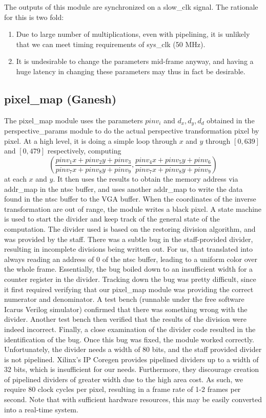 \documentclass{article}
\begin{document}
The outputs of this module are synchronized on a slow\_clk signal.
The rationale for this is two fold:
\begin{enumerate}
    \item Due to large number of multiplications, even with pipelining, it is unlikely that we can meet timing requirements of sys\_clk (50 MHz).
    \item It is undesirable to change the parameters mid-frame anyway, and having a huge latency in changing these parameters may thus in fact be desirable.
\end{enumerate}

\subsection{pixel\_map (Ganesh)}
The pixel\_map module uses the parameters $pinv_i$ and $d_x, d_y, d_d$ obtained in the perspective\_params module to do the actual perspective transformation pixel by pixel.
At a high level, it is doing a simple loop through $x$ and $y$ through $[0, 639]$ and $[0, 479]$ respectively, computing
\begin{equation*}
    \left( \frac{pinv_1 x + pinv_2 y + pinv_3}{pinv_7 x + pinv_8 y + pinv_9}, \frac{pinv_4 x + pinv_5 y + pinv_6}{pinv_7 x + pinv_8 y + pinv_9} \right)
\end{equation*}
at each $x$ and $y$.
It then uses the results to obtain the memory address via addr\_map in the ntsc buffer,
and uses another addr\_map to write the data found in the ntsc buffer to the VGA buffer.
When the coordinates of the inverse transformation are out of range,
the module writes a black pixel.
A state machine is used to start the divider and keep track of the general state of the computation.
The divider used is based on the restoring division algorithm,
and was provided by the staff.
There was a subtle bug in the staff-provided divider, resulting in incomplete divisions being written out.
For us, that translated into always reading an address of $0$ of the ntsc buffer,
leading to a uniform color over the whole frame.
Essentially, the bug boiled down to an insufficient width for a counter register in the divider.
Tracking down the bug was pretty difficult,
since it first required verifying that our pixel\_map module was providing the correct numerator and denominator.
A test bench (runnable under the free software Icarus Verilog simulator) confirmed that there was something wrong with the divider.
Another test bench then verified that the results of the division were indeed incorrect.
Finally, a close examination of the divider code resulted in the identification of the bug.
Once this bug was fixed, the module worked correctly.
Unfortunately, the divider needs a width of 80 bits, and the staff provided divider is not pipelined.
Xilinx's IP Coregen provides pipelined dividers up to a width of 32 bits, which is insufficient for our needs.
Furthermore, they discourage creation of pipelined dividers of greater width due to the high area cost.
As such, we require 80 clock cycles per pixel, resulting in a frame rate of 1-2 frames per second.
Note that with sufficient hardware resources, this may be easily converted into a real-time system.
\end{document}
